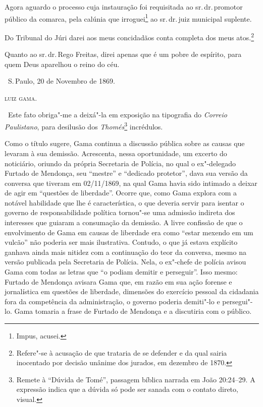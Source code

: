 Agora aguardo o processo cuja instauração foi requisitada ao sr.\,dr.\,promotor público da comarca, pela calúnia que irroguei\footnote{Impus,
  acusei.} ao sr.\,dr.\,juiz municipal suplente.

Do Tribunal do Júri darei aos meus concidadãos conta completa dos meus
atos.\footnote{Refere"-se à acusação de que trataria de se defender e da
  qual sairia inocentado por decisão unânime dos jurados, em dezembro de 1870.}

Quanto ao sr.\,dr.\,Rego Freitas, direi apenas que é um pobre de espírito,
para quem Deus aparelhou o reino do céu.

\medskip

\hfill\ S.\,Paulo, 20 de Novembro de 1869.\smallskip

\hfill\textsc{luiz gama.}

\medskip

\noindent{}


\noindent\ Este fato obriga"-me a deixá"-la em exposição na tipografia do
\emph{Correio Paulistano}, para desilusão dos \emph{Thomés}\footnote{
  Remete à ``Dúvida de Tomé'', passagem bíblica narrada em João 20:24--29.
  A expressão indica que a dúvida só pode ser sanada com o contato
  direto, visual.}
incrédulos.

\pagebreak
\mbox{}\vfill
\thispagestyle{empty}

{\small\noindent
Como o título sugere, Gama continua a discussão pública sobre as
causas que levaram à sua demissão. Acrescenta, nessa oportunidade, um
excerto do noticiário, oriundo da própria Secretaria de Polícia, no qual
o ex"-delegado Furtado de Mendonça, seu ``mestre'' e ``dedicado protetor'',
dava sua versão da conversa que tiveram em 02/11/1869, na qual Gama
havia sido intimado a deixar de agir em ``questões de liberdade''. Ocorre
que, como Gama explora com a notável habilidade que lhe é
característica, o que deveria servir para isentar o governo de
responsabilidade política tornou"-se uma admissão indireta dos
interesses que guiaram a consumação da demissão. A livre confissão de
que o envolvimento de Gama em causas de liberdade era como ``estar
mexendo em um vulcão'' não poderia ser mais ilustrativa. Contudo, o que
já estava explícito ganhava ainda mais nitidez com a continuação do teor
da conversa, mesmo na versão publicada pela Secretaria de Polícia. Nela,
o ex"-chefe de polícia avisou Gama com todas as letras que ``o podiam
demitir e perseguir''. Isso mesmo: Furtado de Mendonça avisara Gama que,
em razão em sua ação forense e jornalística em questões de liberdade,
dimensões do exercício pessoal da cidadania fora da competência da
administração, o governo poderia demiti"-lo e persegui"-lo. Gama tomaria a
frase de Furtado de Mendonça e a discutiria com o público.}

